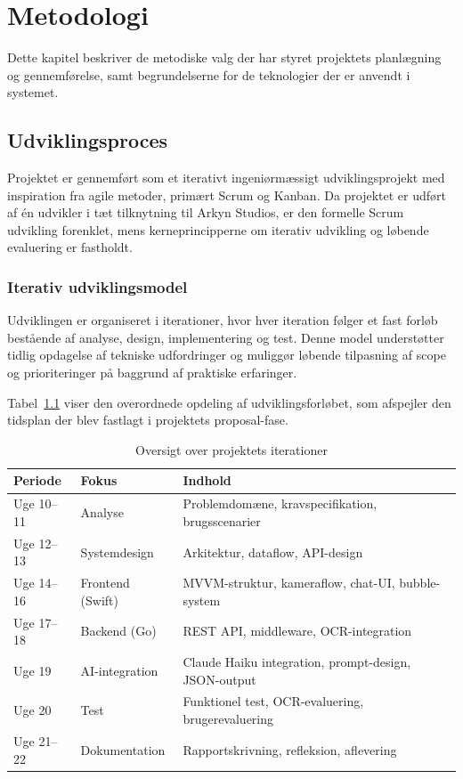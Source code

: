 \chapter{Metodologi}
\label{chap:methodology}

Dette kapitel beskriver de metodiske valg der har styret projektets planlægning og gennemførelse, samt begrundelserne for de teknologier der er anvendt i systemet.

\section{Udviklingsproces}
\label{sec:udviklingsproces}

Projektet er gennemført som et iterativt ingeniørmæssigt udviklingsprojekt med inspiration fra agile metoder, primært Scrum og Kanban. Da projektet er udført af én udvikler i tæt tilknytning til Arkyn Studios, er den formelle Scrum udvikling forenklet, mens kerneprincipperne om iterativ udvikling og løbende evaluering er fastholdt.

\subsection{Iterativ udviklingsmodel}

Udviklingen er organiseret i iterationer, hvor hver iteration følger et fast forløb bestående af analyse, design, implementering og test. Denne model understøtter tidlig opdagelse af tekniske udfordringer og muliggør løbende tilpasning af scope og prioriteringer på baggrund af praktiske erfaringer.

Tabel~\ref{tab:iterationer} viser den overordnede opdeling af udviklingsforløbet, som afspejler den tidsplan der blev fastlagt i projektets proposal-fase.

\begin{table}[H]
  \centering
  \caption{Oversigt over projektets iterationer}
  \label{tab:iterationer}
  \begin{tabularx}{\textwidth}{@{}llX@{}}
    \toprule
    \textbf{Periode} & \textbf{Fokus} & \textbf{Indhold} \\
    \midrule
    Uge 10–11 & Analyse          & Problemdomæne, kravspecifikation, brugsscenarier \\
    Uge 12–13 & Systemdesign     & Arkitektur, dataflow, API-design \\
    Uge 14–16 & Frontend (Swift) & MVVM-struktur, kameraflow, chat-UI, bubble-system \\
    Uge 17–18 & Backend (Go)     & REST API, middleware, OCR-integration \\
    Uge 19    & AI-integration   & Claude Haiku integration, prompt-design, JSON-output \\
    Uge 20    & Test             & Funktionel test, OCR-evaluering, brugerevaluering \\
    Uge 21–22 & Dokumentation    & Rapportskrivning, refleksion, aflevering \\
    \bottomrule
  \end{tabularx}
\end{table}

